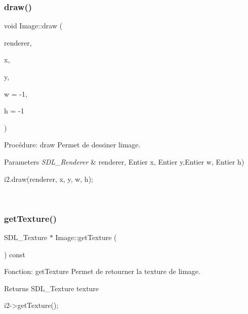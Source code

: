 \subsubsection{\texorpdfstring{draw()}{draw()}}
{\footnotesize\ttfamily void Image\+::draw (\begin{DoxyParamCaption}\item[{S\+D\+L\+\_\+\+Renderer $\ast$}]{renderer,  }\item[{int}]{x,  }\item[{int}]{y,  }\item[{int}]{w = {\ttfamily -\/1},  }\item[{int}]{h = {\ttfamily -\/1} }\end{DoxyParamCaption})}



Procédure\+: draw Permet de dessiner l\textquotesingle{}image. 


\begin{DoxyParams}{Parameters}
{\em S\+D\+L\+\_\+\+Renderer} & renderer, Entier x, Entier y,Entier w, Entier h) 
\begin{DoxyCode}
i2.draw(renderer, x, y, w, h);
\end{DoxyCode}
 \\
\hline
\end{DoxyParams}
\mbox{\label{classImage_ae9e27e310b4322d04366f2882f3a4242}} 
\subsubsection{\texorpdfstring{get\+Texture()}{getTexture()}}
{\footnotesize\ttfamily S\+D\+L\+\_\+\+Texture $\ast$ Image\+::get\+Texture (\begin{DoxyParamCaption}{ }\end{DoxyParamCaption}) const}



Fonction\+: get\+Texture Permet de retourner la texture de l\textquotesingle{}image. 

\begin{DoxyReturn}{Returns}
S\+D\+L\+\_\+\+Texture texture 
\begin{DoxyCode}
i2->getTexture();
\end{DoxyCode}
 
\end{DoxyReturn}
\mbox{\label{classImage_aee71e67e123b6fdd1d3c91caa2892792}} 
